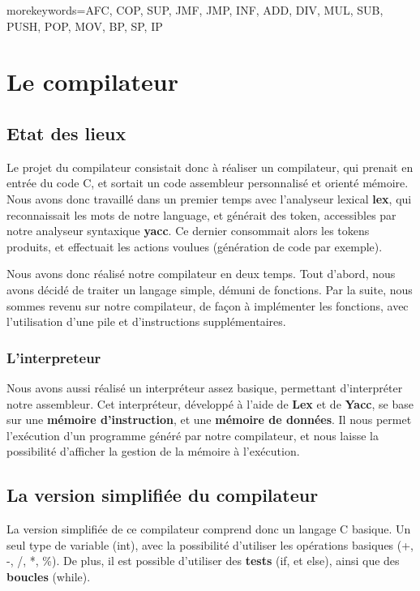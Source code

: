    {morekeywords={AFC, COP, SUP, JMF, JMP, INF, ADD, DIV, MUL, SUB, PUSH, POP, MOV, BP, SP, IP}} %

\section{Le compilateur}

    \subsection{Etat des lieux}
    Le projet du compilateur consistait donc à réaliser un compilateur, qui prenait en entrée du code C, et sortait un code assembleur personnalisé et orienté mémoire. 
    Nous avons donc travaillé dans un premier temps avec l'analyseur lexical \textbf{lex}, qui reconnaissait les mots de notre language, et générait des token, accessibles par notre analyseur syntaxique \textbf{yacc}. Ce dernier consommait alors les tokens produits, et effectuait les actions voulues (génération de code par exemple).
    
    Nous avons donc réalisé notre compilateur en deux temps. Tout d'abord, nous avons décidé de traiter un langage simple, démuni de fonctions. Par la suite, nous sommes revenu sur notre compilateur, de façon à implémenter les fonctions, avec l'utilisation d'une pile et d'instructions supplémentaires.
    
    \subsubsection*{L'interpreteur}
    Nous avons aussi réalisé un interpréteur assez basique, permettant d'interpréter notre assembleur. Cet interpréteur, développé à l'aide de \textbf{Lex} et de \textbf{Yacc}, se base sur une \textbf{mémoire d'instruction}, et une \textbf{mémoire de données}. Il nous permet l'exécution d'un programme généré par notre compilateur, et nous laisse la possibilité d'afficher la gestion de la mémoire à l'exécution.
    
    \subsection{La version simplifiée du compilateur}
    La version simplifiée de ce compilateur comprend donc un langage C basique. Un seul type de variable (int), avec la possibilité d'utiliser les opérations basiques (+, -, /, *, \%). De plus, il est possible d'utiliser des \textbf{tests} (if, et else), ainsi que des \textbf{boucles} (while).
    
